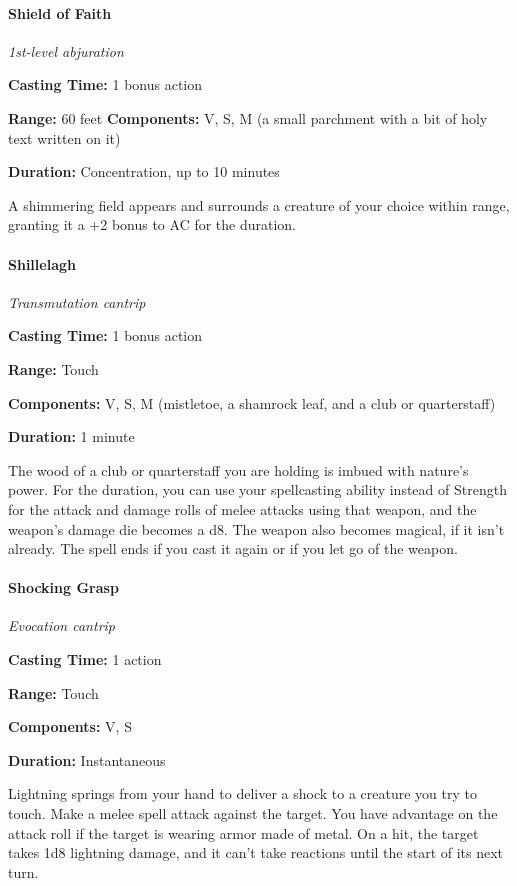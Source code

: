 \documentclass[
]{article}
\begin{document}
\hypertarget{shield-of-faith}{%
\paragraph{Shield of Faith}\label{shield-of-faith}}

\emph{1st-level abjuration}

\textbf{Casting Time:} 1 bonus action

\textbf{Range:} 60 feet \textbf{Components:} V, S, M (a small parchment
with a bit of holy text written on it)

\textbf{Duration:} Concentration, up to 10 minutes

A shimmering field appears and surrounds a creature of your choice
within range, granting it a +2 bonus to AC for the duration.

\hypertarget{shillelagh}{%
\paragraph{Shillelagh}\label{shillelagh}}

\emph{Transmutation cantrip}

\textbf{Casting Time:} 1 bonus action

\textbf{Range:} Touch

\textbf{Components:} V, S, M (mistletoe, a shamrock leaf, and a club or
quarterstaff)

\textbf{Duration:} 1 minute

The wood of a club or quarterstaff you are holding is imbued with
nature's power. For the duration, you can use your spellcasting ability
instead of Strength for the attack and damage rolls of melee attacks
using that weapon, and the weapon's damage die becomes a d8. The weapon
also becomes magical, if it isn't already. The spell ends if you cast it
again or if you let go of the weapon.

\hypertarget{shocking-grasp}{%
\paragraph{Shocking Grasp}\label{shocking-grasp}}

\emph{Evocation cantrip}

\textbf{Casting Time:} 1 action

\textbf{Range:} Touch

\textbf{Components:} V, S

\textbf{Duration:} Instantaneous

Lightning springs from your hand to deliver a shock to a creature you
try to touch. Make a melee spell attack against the target. You have
advantage on the attack roll if the target is wearing armor made of
metal. On a hit, the target takes 1d8 lightning damage, and it can't
take reactions until the start of its next turn.
\end{document}
